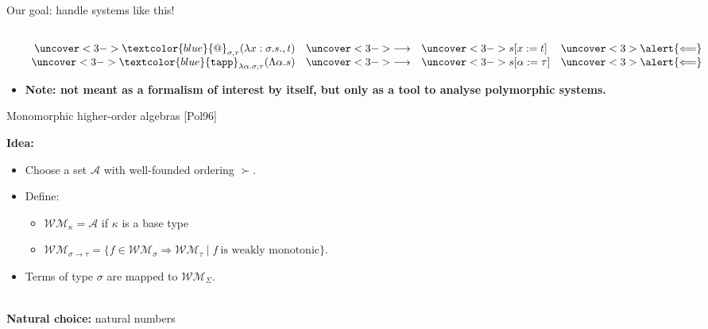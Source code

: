 \documentclass[10pt,presentation,color=names]{beamer}
\newcommand{\arrtype}{\rightarrow}
\newcommand{\abs}[2]{\lambda #1.#2}
\newcommand{\tabs}[2]{\Lambda #1.#2}
\newcommand{\red}{\longrightarrow}
\newcommand{\WM}{\mathcal{W\!M}}
\newcommand{\symb}[1]{\textcolor{blue}{\mathtt{#1}}}
\begin{document}
\begin{frame}{Our goal: handle systems like this!}
\begin{itemize}
\[\begin{array}{rcll}
{{  }} \\
\uncover<3->{\symb{@}_{\sigma,\tau}(\abs{x:\sigma.s},t)} & \uncover<3->{\red} & \uncover<3->{s[x:=t]} &
  \uncover<3>{\alert{\Longleftarrow}} \\
\uncover<3->{\symb{tapp}_{\lambda \alpha.\sigma,\tau}(\tabs{\alpha}{s})} & \uncover<3->{\red} & \uncover<3->{s[\alpha:=\tau]} &
  \uncover<3>{\alert{\Longleftarrow}} \\
\end{array}
\]
\item\pause\pause\pause \textbf{\alert{Note:} not meant as a formalism of interest by itself, but only as a tool to analyse polymorphic systems.}
\end{itemize}
\end{frame}

\begin{frame}{Monomorphic higher-order algebras [Pol96]}

\textbf{Idea:}
\begin{itemize}
\item Choose a set $\mathcal{A}$ with well-founded ordering $\succ$.
\item Define:
  \begin{itemize}
  \item $\WM_{\kappa} = \mathcal{A}$ if $\kappa$ is a \alert{base type}
  \item $\WM_{\sigma \arrtype \tau} = \{ f \in \WM_\sigma \Longrightarrow \WM_\tau \mid f\ \text{is weakly monotonic} \}$.
  \end{itemize}
\item Terms of type $\sigma$ are mapped to $\WM_\Sigma$.
\end{itemize}

\ \\\textbf{Natural choice:} natural numbers

\end{frame}
\end{document}
